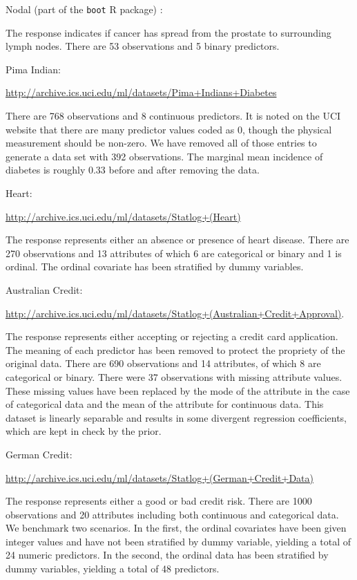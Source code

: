 \documentclass[11pt]{article}
\begin{document}
\begin{outline}

\1 Nodal (part of the \texttt{boot} R package) :

The response indicates if cancer has spread from the prostate to surrounding
lymph nodes.  There are 53 observations and 5 binary predictors.

\1 Pima Indian:

\url{http://archive.ics.uci.edu/ml/datasets/Pima+Indians+Diabetes}

There are 768 observations and 8 continuous predictors.  It is noted on the UCI
website that there are many predictor values coded as 0, though the physical
measurement should be non-zero.  We have removed all of those entries to
generate a data set with 392 observations.  The marginal mean incidence of
diabetes is roughly 0.33 before and after removing the data.

\1 Heart:

\url{http://archive.ics.uci.edu/ml/datasets/Statlog+(Heart)}

The response represents either an absence or presence of heart disease.  There
are 270 observations and 13 attributes of which 6 are categorical or binary and
1 is ordinal.  The ordinal covariate has been stratified by dummy variables.

\1 Australian Credit: 

\url{http://archive.ics.uci.edu/ml/datasets/Statlog+(Australian+Credit+Approval)}.

The response represents either accepting or rejecting a credit card application.
The meaning of each predictor has been removed to protect the propriety of the
original data.  There are 690 observations and 14 attributes, of which 8 are
categorical or binary.  There were 37 observations with missing attribute
values.  These missing values have been replaced by the mode of the attribute in
the case of categorical data and the mean of the attribute for continuous data.
This dataset is linearly separable and results in some divergent regression
coefficients, which are kept in check by the prior.

\1 German Credit: 

\url{http://archive.ics.uci.edu/ml/datasets/Statlog+(German+Credit+Data)}

The response represents either a good or bad credit risk.  There are 1000
observations and 20 attributes including both continuous and categorical data.
We benchmark two scenarios.  In the first, the ordinal covariates have been
given integer values and have not been stratified by dummy variable, yielding a
total of 24 numeric predictors.  In the second, the ordinal data has been
stratified by dummy variables, yielding a total of 48 predictors.

\end{outline}
\end{document}
